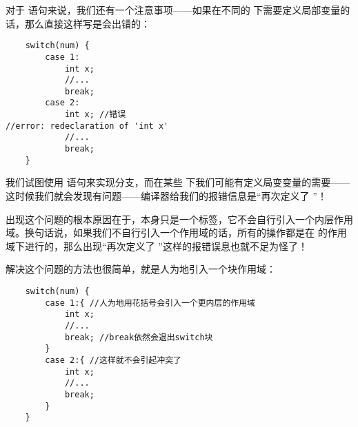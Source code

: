 对于 \lstinline@switch@ 语句来说，我们还有一个注意事项——如果在不同的 \lstinline@case@ 下需要定义局部变量的话，那么直接这样写是会出错的：
\begin{lstlisting}
    switch(num) {
        case 1:
            int x;
            //...
            break;
        case 2:
            int x; //错误
//error: redeclaration of 'int x'
            //...
            break;
    }
\end{lstlisting}
我们试图使用 \lstinline@switch@ 语句来实现分支，而在某些 \lstinline@case@ 下我们可能有定义局变变量的需要——这时候我们就会发现有问题——编译器给我们的报错信息是``再次定义了 \lstinline@x@''！\par
出现这个问题的根本原因在于，\lstinline@case@ 本身只是一个标签，它不会自行引入一个内层作用域。换句话说，如果我们不自行引入一个作用域的话，所有的操作都是在 \lstinline@switch@ 的作用域下进行的，那么出现``再次定义了 \lstinline@x@''这样的报错误息也就不足为怪了！\par
解决这个问题的方法也很简单，就是人为地引入一个块作用域：
\begin{lstlisting}
    switch(num) {
        case 1:{ //人为地用花括号会引入一个更内层的作用域
            int x;
            //...
            break; //break依然会退出switch块
        }
        case 2:{ //这样就不会引起冲突了
            int x;
            //...
            break;
        }
    }
\end{lstlisting}\par
